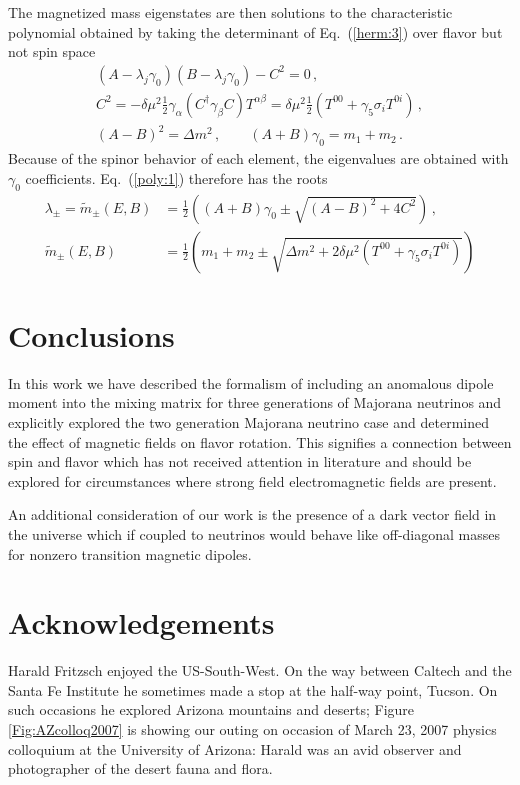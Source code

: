 \documentclass[addchapnum]{ws-rv961x669} %
\newcommand{\req}[1]{Eq.~(\ref{#1})}
\begin{document}
The magnetized mass eigenstates are then solutions to the characteristic polynomial obtained by taking the determinant of \req{herm:3} over flavor but not spin space
\begin{align}
    \label{poly:1}
    (A-\lambda_{j}\gamma_{0})(B-\lambda_{j}\gamma_{0})-C^{2}=0\,,\\
    C^{2} = -\delta\mu^{2}\frac{1}{2}\gamma_{\alpha}(C^{\dag}\gamma_{\beta}C)T^{\alpha\beta} = 
    \delta\mu^{2}\frac{1}{2}\left(T^{00}+\gamma_{5}\sigma_{i}T^{0i}\right)\,,\\
    (A-B)^{2} = \Delta m^{2}\,,\qquad (A+B)\gamma_{0} = m_{1} + m_{2}\,.
\end{align}
Because of the spinor behavior of each element, the eigenvalues are obtained with $\gamma_{0}$ coefficients. \req{poly:1} therefore has the roots
\begin{align}
    \label{poly:2}
    \lambda_{\pm} = \widetilde m_{\pm}(E,B) &= \frac{1}{2}\left((A+B)\gamma_{0}\pm\sqrt{(A-B)^{2}+4C^{2}}\right)\,,\\
    \widetilde m_{\pm}(E,B) &= \frac{1}{2}\left(m_{1}+m_{2}\pm\sqrt{\Delta m^{2}+2\delta\mu^{2}\left(T^{00}+\gamma_{5}\sigma_{i}T^{0i}\right)}\right) 
\end{align}

\section{Conclusions}
In this work we have described the formalism of including an anomalous dipole moment into the mixing matrix for three generations of Majorana neutrinos and explicitly explored the two generation Majorana neutrino case and determined the effect of magnetic fields on flavor rotation. This signifies a connection between spin and flavor which has not received attention in literature and should be explored for circumstances where strong field electromagnetic fields are present.

An additional consideration of our work is the presence of a dark vector field in the universe which if coupled to neutrinos would behave like off-diagonal masses for nonzero transition magnetic dipoles.

\section*{Acknowledgements}
Harald Fritzsch enjoyed the US-South-West. On the way between Caltech and the Santa Fe Institute he sometimes made a stop at the half-way point, Tucson. On such occasions he explored Arizona mountains and  deserts; Figure\,\ref{Fig:AZcolloq2007} is showing our outing on occasion of March 23, 2007 physics colloquium at the University of Arizona: Harald was an avid observer and photographer of the desert fauna and flora. 
 
\end{document}
